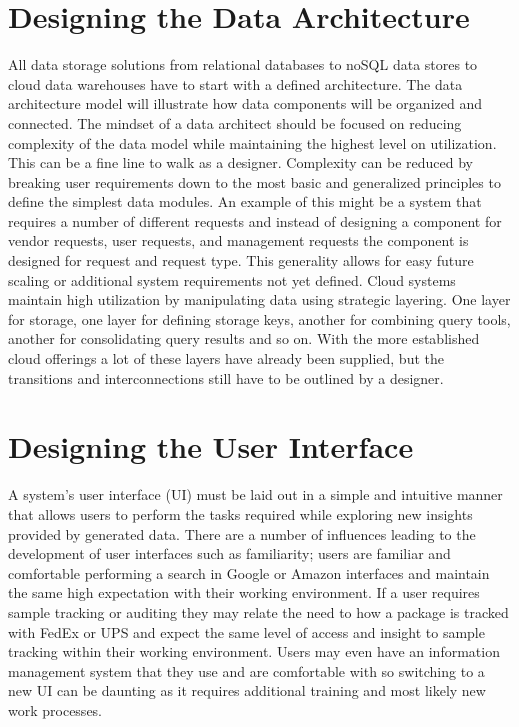 \documentclass[sigconf]{acmart}
\begin{document}
\section{Designing the Data Architecture}
All data storage solutions from relational databases to noSQL data stores to cloud data warehouses have to start with a defined architecture. The data architecture model will illustrate how data components will be organized and connected. The mindset of a data architect should be focused on reducing complexity of the data model while maintaining the highest level on utilization. This can be a fine line to walk as a designer. Complexity can be reduced by breaking user requirements down to the most basic and generalized principles to define the simplest data modules. An example of this might be a system that requires a number of different requests and instead of designing a component for vendor requests, user requests, and management requests the component is designed for request and request type. This generality allows for easy future scaling or additional system requirements not yet defined. Cloud systems maintain high utilization by manipulating data using strategic layering. One layer for storage, one layer for defining storage keys, another for combining query tools, another for consolidating query results and so on. With the more established cloud offerings a lot of these layers have already been supplied, but the transitions and interconnections still have to be outlined by a designer\cite{Saltzer}.

\section{Designing the User Interface}
A system's user interface (UI) must be laid out in a simple and intuitive manner that allows users to perform the tasks required while exploring new insights provided by generated data. There are a number of influences leading to the development of user interfaces such as familiarity; users are familiar and comfortable performing a search in Google or Amazon interfaces and maintain the same high expectation with their working environment. If a user requires sample tracking or auditing they may relate the need to how a package is tracked with FedEx or UPS and expect the same level of access and insight to sample tracking within their working environment. Users may even have an information management system that they use and are comfortable with so switching to a new UI can be daunting as it requires additional training and most likely new work processes.
\end{document}
